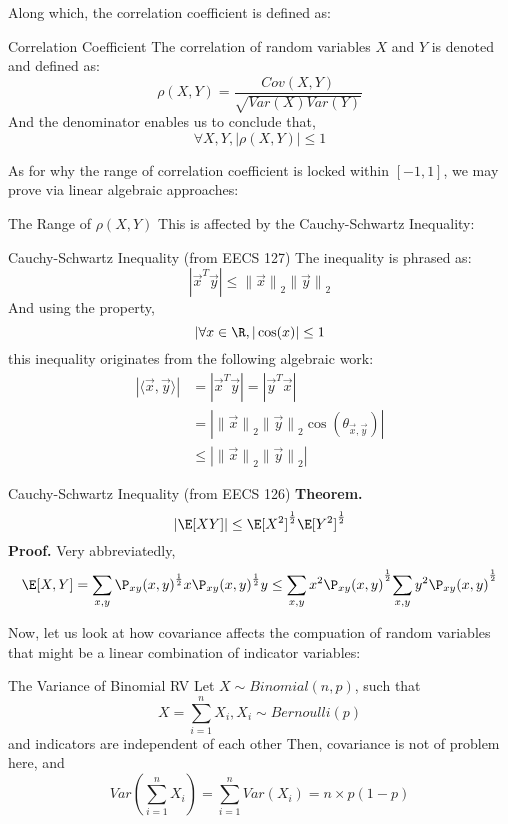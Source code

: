 Along which, the correlation coefficient is defined as:
\begin{ln-define}{Correlation Coefficient}{}
    The correlation of random variables $X$ and $Y$ is denoted and defined as:
    \[
        \rho(X, Y) = \frac{Cov(X, Y)}{\sqrt{Var(X) Var(Y)}}
    \]
    And the denominator enables us to conclude that,
    \[
        \forall X, Y, |\rho(X, Y)| \leq 1
    \]
\end{ln-define}
As for why the range of correlation coefficient is locked within $[-1, 1]$, we may prove via linear algebraic approaches:
\begin{ln-explain}{The Range of $\rho(X, Y)$}{}
    This is affected by the Cauchy-Schwartz Inequality:
    \begin{ln-define}{Cauchy-Schwartz Inequality (from EECS 127)}{}
        The inequality is phrased as:
        \[
            |\vec{x}^T \vec{y}| \leq {\lVert \vec{x} \rVert}_2 {\lVert \vec{y} \rVert}_2
        \]
        And using the property,
        \[|\forall x \in \R, |\cos(x)| \leq 1\]
        this inequality originates from the following algebraic work:
        \begin{align*}
            |\langle \vec{x}, \vec{y} \rangle| &= |\vec{x}^T \vec{y}| = |\vec{y}^T \vec{x}| \\
            &= |{\lVert \vec{x} \rVert}_2 {\lVert \vec{y} \rVert}_2 \cos(\theta_{\vec{x}, \vec{y}})| \\
            &\leq |{\lVert \vec{x} \rVert}_2 {\lVert \vec{y} \rVert}_2|
        \end{align*}
    \end{ln-define}
    \begin{ln-define}{Cauchy-Schwartz Inequality (from EECS 126)}{}
        \textbf{Theorem.}
        \[
            |\E[XY]| \leq {\E[X^2]}^{\frac{1}{2}} {\E[Y^2]}^{\frac{1}{2}}
        \]
        \tcblower
        \textbf{Proof.} Very abbreviatedly,
        \[
            \E[X, Y]
            = \sum_{x, y} {\P_{xy}(x, y)}^\frac{1}{2}x{\P_{xy}(x, y)}^\frac{1}{2}y
            \leq {\sum_{x, y} x^2 \P_{xy}(x, y)}^\frac{1}{2} {\sum_{x, y} y^2 \P_{xy}(x, y)}^\frac{1}{2}
        \]
    \end{ln-define}
\end{ln-explain}
Now, let us look at how covariance affects the compuation of random variables that might be a linear combination of indicator variables:
\begin{ln-explain}{The Variance of Binomial RV}{}
    Let $X \sim Binomial(n, p)$, such that
    \[
        X = \sum_{i = 1}^n X_i, X_i \sim Bernoulli(p)
    \]
    and indicators are independent of each other
    Then, covariance is not of problem here, and
    \[
        Var(\sum_{i = 1}^n X_i) = \sum_{i = 1}^n Var(X_i) = n \times p(1 - p)
    \]
\end{ln-explain}

